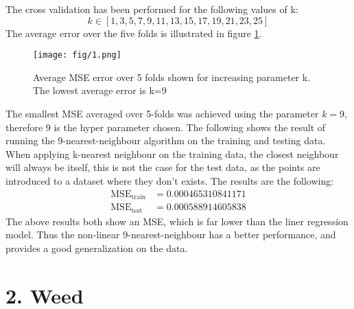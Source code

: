 \documentclass{article}
\begin{document}
The cross validation has been performed for the following values of k:
$$ k \in \left[ 1,3,5,7,9,11,13,15,17,19,21,23,25 \right] $$
The average error over the five folds is illustrated in figure \ref{fig:mulplots}.
\begin{figure}[H]
  \centering
  \texttt{[image: fig/1.png]}
  \caption{Average MSE error over 5 folds shown for increasing parameter k. The lowest average error is k=9}
  \label{fig:mulplots}
\end{figure}
The smallest MSE averaged over 5-folds was achieved using the parameter $k=9$, therefore 9 is the hyper parameter chosen. The following shows the result of running the 9-nearest-neighbour algorithm on the training and testing data. When applying k-nearest neighbour on the training data, the closest neighbour will always be itself, this is not the case for the test data, as the points are introduced to a dataset where they don't exists. The results are the following:
\begin{align*}
\text{MSE}_{\text{train}} &=  0.000465310841171 \\
\text{MSE}_{\text{test}} &=  0.000588914605838
\end{align*}
The above results both show an MSE, which is far lower than the liner regression model. Thus the non-linear 9-nearest-neighbour has a better performance, and provides a good generalization on the data.
\section{2. Weed}
\end{document}
